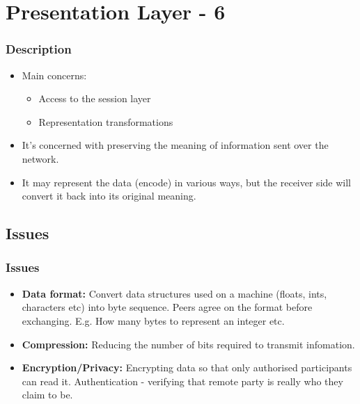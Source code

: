 \documentclass{beamer}
\begin{document}
\section{Presentation Layer - 6}
\begin{frame}
\frametitle{Description}
\begin{itemize}
\item Main concerns:
\begin{itemize}
\item Access to the session layer
\item Representation transformations
\end{itemize}
\item It's concerned with preserving the meaning of information sent over the network.
\item It may represent the data (encode) in various ways, but the receiver side will convert it back into its original meaning.
\end{itemize}
\end{frame}
\subsection{Issues}
\begin{frame}
\frametitle{Issues}
\begin{itemize}
\item \textbf{ Data format:} Convert data structures used on a machine (floats, ints, characters etc) into byte sequence. {\color{red} Peers} agree on the format before exchanging. E.g. How many bytes to represent an integer etc.
\item \textbf{Compression:} Reducing the number of bits required to transmit infomation.
\item \textbf{Encryption/Privacy:} Encrypting data so that only authorised participants can read it. {\color{green} Authentication} - verifying that remote party is really who they claim to be.
\end{itemize}
\end{frame}
\end{document}

